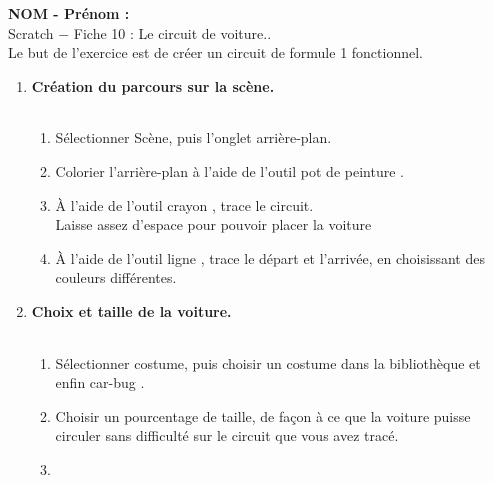\documentclass[12pt,a4paper]{article} %
\newcommand{\ent}[2]{\par \noindent \textbf{NOM - Prénom :} \dotfill \vspace{9pt} \\ Scratch $-$ Fiche #1 : #2.}
\newcounter {exercice}
\begin{document}
\ent{10}{Le circuit de voiture.} \vspace{24pt} \\
Le but de l'exercice est de créer un circuit de formule 1 fonctionnel. \vspace{9pt} 
\begin{enumerate}[1{)}]
\item
\textbf{Création du parcours sur la scène.} \hfill \renewcommand{\arraystretch}{2}
\begin{tabular}{|p{5mm}|}
\hline
\\
\hline
\end{tabular} \vspace{-6pt}
\begin{enumerate}[a{)}]
\item
Sélectionner Scène, puis l'onglet arrière-plan.
\item
Colorier l'arrière-plan à l'aide de l'outil \og pot de peinture \fg{}.
\item
À l'aide de l'outil \og crayon \fg{}, trace le circuit. \\
Laisse assez d'espace pour pouvoir placer la voiture
\item
À l'aide de l'outil \og ligne \fg, trace le départ et l'arrivée, en choisissant des couleurs différentes.
\end{enumerate} \vspace{6pt}
\item
\textbf{Choix et taille de la voiture.} \hfill \renewcommand{\arraystretch}{2}
\begin{tabular}{|p{5mm}|}
\hline
\\
\hline
\end{tabular} \vspace{-6pt}
\begin{enumerate}[a{)}]
\item
Sélectionner costume, puis choisir un costume dans la bibliothèque et enfin \og car-bug \fg{}.
\item
Choisir un pourcentage de taille, de façon à ce que la voiture puisse circuler sans difficulté sur le circuit que vous avez tracé.
\item

\end{enumerate}
\end{enumerate}
\end{document}
